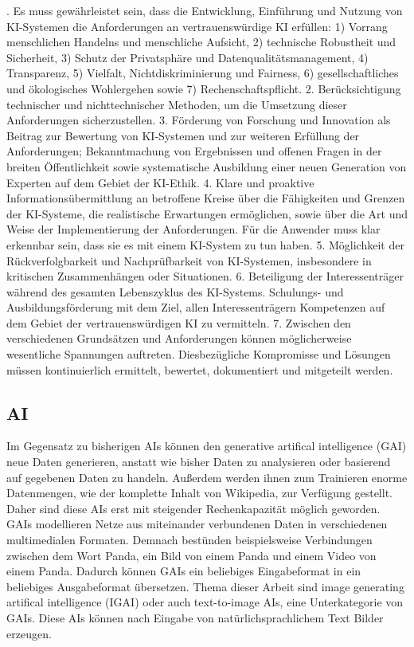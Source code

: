 \documentclass[12pt]{article}
\begin{document}
. Es muss gewährleistet sein, dass die Entwicklung, Einführung und Nutzung von KI-Systemen die Anforderungen an vertrauenswürdige KI erfüllen:
1) Vorrang menschlichen Handelns und menschliche Aufsicht, 2) technische Robustheit und Sicherheit, 3) Schutz der Privatsphäre und Datenqualitätsmanagement, 4) Transparenz, 5) Vielfalt, Nichtdiskriminierung und Fairness, 6) gesellschaftliches und ökologisches Wohlergehen sowie 7) Rechenschaftspflicht. 
2. Berücksichtigung technischer und nichttechnischer Methoden, um die Umsetzung dieser Anforderungen sicherzustellen. 
3. Förderung von Forschung und Innovation als Beitrag zur Bewertung von KI-Systemen und zur weiteren Erfüllung der Anforderungen; Bekanntmachung von Ergebnissen und offenen Fragen in der breiten Öffentlichkeit sowie systematische Ausbildung einer neuen Generation von Experten auf dem Gebiet der KI-Ethik. 
4. Klare und proaktive Informationsübermittlung an betroffene Kreise über die Fähigkeiten und Grenzen der KI-Systeme, die realistische Erwartungen ermöglichen, sowie über die Art und Weise der Implementierung der Anforderungen. Für die Anwender muss klar erkennbar sein, dass sie es mit einem KI-System zu tun haben. 
5. Möglichkeit der Rückverfolgbarkeit und Nachprüfbarkeit von KI-Systemen, insbesondere in kritischen Zusammenhängen oder Situationen. 
6. Beteiligung der Interessenträger während des gesamten Lebenszyklus des KI-Systems. Schulungs- und Ausbildungsförderung mit dem Ziel, allen Interessenträgern Kompetenzen auf dem Gebiet der vertrauenswürdigen KI zu vermitteln. 
7. Zwischen den verschiedenen Grundsätzen und Anforderungen können möglicherweise wesentliche Spannungen auftreten. Diesbezügliche Kompromisse und Lösungen müssen kontinuierlich ermittelt, bewertet, dokumentiert und mitgeteilt werden.\grqq{}


\subsection{AI}
Im Gegensatz zu bisherigen AIs können den generative artifical intelligence (GAI) neue Daten generieren, anstatt wie bisher Daten zu analysieren oder basierend auf gegebenen Daten zu handeln. Außerdem werden ihnen zum Trainieren enorme Datenmengen, 
wie der komplette Inhalt von Wikipedia, zur Verfügung gestellt. Daher sind diese AIs erst mit steigender Rechenkapazität möglich geworden. GAIs modellieren Netze aus miteinander verbundenen Daten in verschiedenen multimedialen Formaten. Demnach 
bestünden beispielsweise Verbindungen zwischen dem Wort Panda, ein Bild von einem Panda und einem Video von einem Panda. Dadurch können GAIs ein beliebiges Eingabeformat in ein beliebiges Ausgabeformat übersetzen. Thema dieser Arbeit sind image generating 
artifical intelligence (IGAI) oder auch text-to-image AIs, eine Unterkategorie von GAIs. Diese AIs können nach Eingabe von natürlichsprachlichem Text Bilder erzeugen.
\cite{Roberto}
\end{document}
